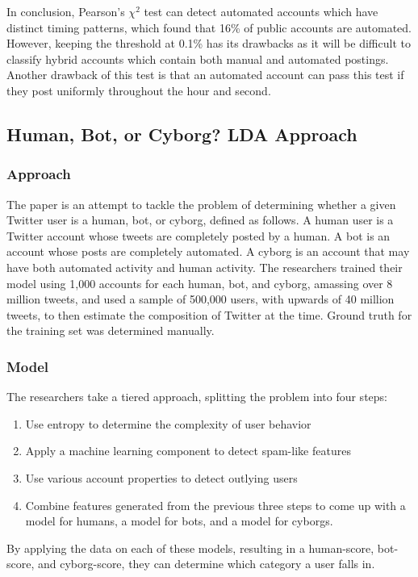 \documentclass[11pt, oneside]{article}   	%
\begin{document}
\quad In conclusion, Pearson's $\chi^2$ test can detect automated accounts which have distinct timing patterns, which found that 16\% of public accounts are automated. However, keeping the threshold at 0.1\% has its drawbacks as it will be difficult to classify hybrid accounts which contain both manual and automated postings.
Another drawback of this test is that an automated account can pass this test if they post uniformly throughout the hour and second.

\subsection*{Human, Bot, or Cyborg? LDA Approach}

\subsubsection*{Approach}

\quad The paper is an attempt to tackle the problem of determining whether a given Twitter user is a human, bot, or cyborg, defined as follows.
A human user is a Twitter account whose tweets are completely posted by a human.
A bot is an account whose posts are completely automated.
A cyborg is an account that may have both automated activity and human activity.
The researchers trained their model using 1,000 accounts for each human, bot, and cyborg, amassing over 8 million tweets, and used a sample of 500,000 users, with upwards of 40 million tweets, to then estimate the composition of Twitter at the time.
Ground truth for the training set was determined manually.

\subsubsection*{Model}

\quad The researchers take a tiered approach, splitting the problem into four steps:
\begin{enumerate}
	\item Use entropy to determine the complexity of user behavior
	\item Apply a machine learning component to detect spam-like features
	\item Use various account properties to detect outlying users
	\item Combine features generated from the previous three steps to come up with a model for humans, a model for bots, and a model for cyborgs. 
\end{enumerate}	
By applying the data on each of these models, resulting in a human-score, bot-score, and cyborg-score, they can determine which category a user falls in.
\end{document}
